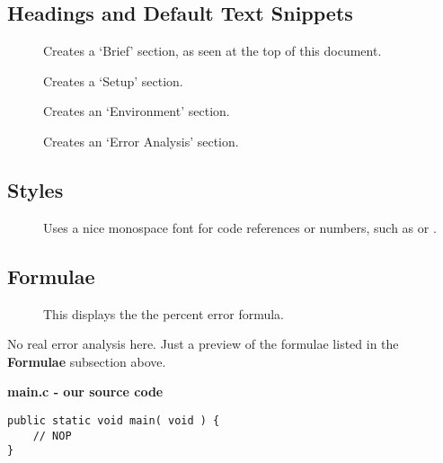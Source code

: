 \documentclass{technical_assignment_report}
\begin{document}
\subsection*{Headings and Default Text Snippets}
\begin{description}
\item[] Creates a \lq{}Brief\rq{} section, as seen at the top of this document.
\item[]  Creates a \lq{}Setup\rq{} section.
\item[] Creates an \lq{}Environment\rq{} section.
\item[] Creates an \lq{}Error Analysis\rq{} section.
\end{description}

\subsection*{Styles}
\begin{description}
\item[] Uses a nice monospace font for code references or numbers, such as  or .
\end{description}

\subsection*{Formulae}
\begin{description}
\item[] This displays the the percent error formula. 
\end{description}

\erroranalysis
No real error analysis here. Just a preview of the formulae listed in the {\bf Formulae} subsection above.



{\bf main.c - our source code \assignment}
\begin{verbatim}
public static void main( void ) {
    // NOP
}
\end{verbatim}
\end{document}
